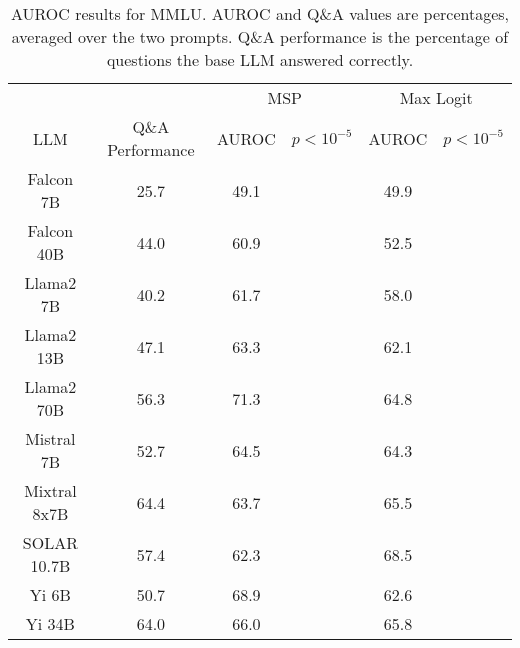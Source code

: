 \begin{table*}
\centering
\begin{tabular}{c|c|c|c|c|c}
& & \multicolumn{2}{c|}{MSP} & \multicolumn{2}{c}{Max Logit} \\ 
LLM & Q\&A Performance & AUROC & $p < 10^{-5}$ & AUROC & $p < 10^{-5}$\\ \hline
Falcon 7B & 25.7 & 49.1 &  & 49.9 & \\
Falcon 40B & 44.0 & 60.9 &  & 52.5 & \\
Llama2 7B & 40.2 & 61.7 &  & 58.0 & \\
Llama2 13B & 47.1 & 63.3 &  & 62.1 & \\
Llama2 70B & 56.3 & 71.3 &  & 64.8 & \\
Mistral 7B & 52.7 & 64.5 &  & 64.3 & \\
Mixtral 8x7B & 64.4 & 63.7 &  & 65.5 & \\
SOLAR 10.7B & 57.4 & 62.3 &  & 68.5 & \\
Yi 6B & 50.7 & 68.9 &  & 62.6 & \\
Yi 34B & 64.0 & 66.0 &  & 65.8 & \\
\hline
\end{tabular}
\caption{AUROC results for MMLU. AUROC and Q\&A values are percentages, averaged over the two prompts. Q\&A performance is the percentage of questions the base LLM answered correctly.}
\label{tab:mmlu_auroc}
\end{table*}
